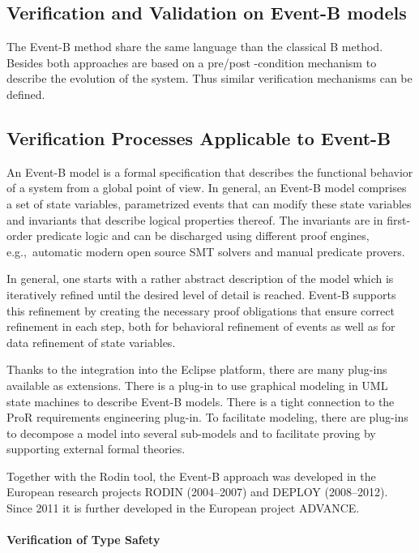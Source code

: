 \subsection{Verification and Validation on Event-B models}

The Event-B method share the same language than the classical  B method. Besides both approaches are based on a pre/post -condition mechanism to describe the evolution of the system. Thus similar verification mechanisms can be defined.


\subsection{Verification Processes Applicable to Event-B}
\label{sec:verif-proc-appl}

An Event-B model is a formal specification that describes the functional
behavior of a system from a global point of view. In general, an Event-B model
comprises a set of state variables, parametrized events that can modify these
state variables and invariants that describe logical properties thereof.  The
invariants are in first-order predicate logic and can be discharged using
different proof engines, e.g.,\  automatic modern open source SMT solvers and
manual predicate provers.

In general, one starts with a rather abstract description of the model which is
iteratively refined until the desired level of detail is reached. Event-B
supports this refinement by creating the necessary proof obligations that ensure
correct refinement in each step, both for behavioral refinement of events as
well as for data refinement of state variables.

Thanks to the integration into the Eclipse platform, there are many plug-ins
available as extensions. There is a plug-in to use graphical modeling in UML
state machines to describe Event-B models. There is a tight connection to the
ProR requirements engineering plug-in. To facilitate modeling, there are
plug-ins to decompose a model into several sub-models and to facilitate proving
by supporting external formal theories.

Together with the Rodin tool, the Event-B approach was developed in the European
research projects RODIN (2004--2007) and DEPLOY (2008--2012). Since 2011 it is
further developed in the European project ADVANCE\@.

\paragraph{Verification of Type Safety}
\label{sec:verif-type-safety}

